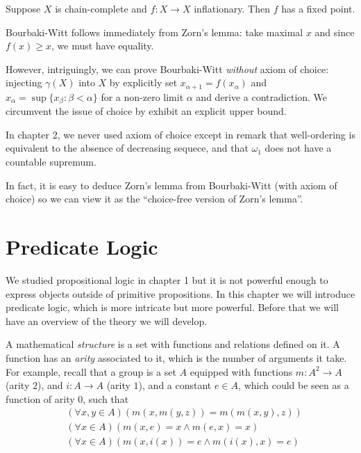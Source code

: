 \documentclass[a4paper]{article}
\begin{document}
\begin{theorem}
  Suppose \(X\) is chain-complete and \(f: X \to X\) inflationary. Then \(f\) has a fixed point.
\end{theorem}

Bourbaki-Witt follows immediately from Zorn's lemma: take maximal \(x\) and since \(f(x) \geq x\), we must have equality.

However, intriguingly, we can prove Bourbaki-Witt \emph{without} axiom of choice: injecting \(\gamma(X)\) into \(X\) by explicitly set \(x_{\alpha + 1} = f(x_\alpha)\) and \(x_\alpha = \sup\{x_\beta: \beta < \alpha\}\) for a non-zero limit \(\alpha\) and derive a contradiction. We circumvent the issue of choice by exhibit an explicit upper bound.

\begin{note}
  In chapter 2, we never used axiom of choice except in remark that well-ordering is equivalent to the absence of decreasing sequece, and that \(\omega_1\) does not have a countable supremum.
\end{note}

In fact, it is easy to deduce Zorn's lemma from Bourbaki-Witt (with axiom of choice) so we can view it as the ``choice-free version of Zorn's lemma''.

\section{Predicate Logic}

We studied propositional logic in chapter 1 but it is not powerful enough to express objects outside of primitive propositions. In this chapter we will introduce predicate logic, which is more intricate but more powerful. Before that we will have an overview of the theory we will develop.

A mathematical \emph{structure} is a set with functions and relations defined on it. A function has an \emph{arity} associated to it, which is the number of arguments it take. For example, recall that a group is a set \(A\) equipped with functions \(m: A^2 \to A\) (arity \(2\)), and \(i: A \to A\) (arity \(1\)), and a constant \(e \in A\), which could be seen as a function of arity \(0\), such that
\begin{align*}
  & (\forall x, y \in A) (m(x, m(y, z)) = m(m(x, y), z)) \\
  & (\forall x \in A) (m(x, e) = x \land m(e, x) = x) \\
  & (\forall x \in A) (m(x, i(x)) = e \land m(i(x), x) = e)
\end{align*}
\end{document}
